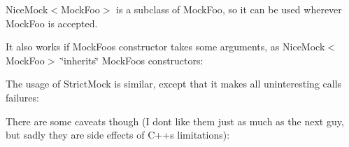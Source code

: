 \begin{DoxyCode}{0}
\DoxyCodeLine{}
\DoxyCodeLine{\}}
\end{DoxyCode}


{\ttfamily Nice\+Mock$<$Mock\+Foo$>$} is a subclass of {\ttfamily Mock\+Foo}, so it can be used wherever {\ttfamily Mock\+Foo} is accepted.

It also works if {\ttfamily Mock\+Foo}\textquotesingle{}s constructor takes some arguments, as {\ttfamily Nice\+Mock$<$Mock\+Foo$>$} \char`\"{}inherits\char`\"{} {\ttfamily Mock\+Foo}\textquotesingle{}s constructors\+:


\begin{DoxyCode}{0}
\DoxyCodeLine{}
\DoxyCodeLine{\}}
\end{DoxyCode}


The usage of {\ttfamily Strict\+Mock} is similar, except that it makes all uninteresting calls failures\+:


\begin{DoxyCode}{0}
\DoxyCodeLine{}
\DoxyCodeLine{}
\DoxyCodeLine{\}}
\end{DoxyCode}


There are some caveats though (I don\textquotesingle{}t like them just as much as the next guy, but sadly they are side effects of C++\textquotesingle{}s limitations)\+:


